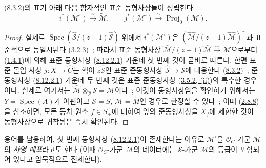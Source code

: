 \begin{proposition}[8.12.2]
\label{II.8.12.2-ko}
(\hyperref[II.8.3.2-ko]{8.3.2})의 표기 아래 다음 함자적인 표준
동형사상들이 성립한다.
\begin{equation}
\label{II.8.12.2.1-ko}
  i^*(\mathcal{M}^{\square})\xrightarrow{\sim}\widetilde{\mathcal{M}},
  \qquad
  j^*(\mathcal{M}^{\square})\xrightarrow{\sim}
  \operatorname{Proj}_0(\mathcal{M}).
\tag{8.12.2.1}
\end{equation}
\end{proposition}

\begin{proof}
실제로 $\operatorname{Spec}(\widehat{\mathcal{S}}/(z-1)\widehat{\mathcal{S}})$
위에서 $i^*(\mathcal{M}^{\square})$은
$\left(\widehat{\mathcal{M}}/(z-1)\widehat{\mathcal{M}}\right)^{\sim}$과
표준적으로 동일시된다
(\hyperref[II.3.2.3-ko]{3.2.3})~; 따라서 표준 동형사상
$\widehat{\mathcal{M}}/(z-1)\widehat{\mathcal{M}}
\xrightarrow{\sim}\mathcal{M}$으로부터
(\hyperref[II.1.4.1-ko]{1.4.1})에 의해 표준 동형사상
(\hyperref[II.8.12.2.1-ko]{8.12.2.1}) 가운데 첫 번째 것이 곧바로
따른다. 한편 표준 몰입 사상 $j:X\to\widehat{C}$는 핵이
$z\widehat{\mathcal{S}}$인 표준 준동형사상
$\widehat{\mathcal{S}}\to\mathcal{S}$에 대응한다
(\hyperref[II.8.3.2-ko]{8.3.2})~; 준동형사상
(\hyperref[II.8.12.2.1-ko]{8.12.2.1}) 가운데 두 번째 것은 표준
준동형사상 (\hyperref[II.3.5.2-ko]{3.5.2, (ii)})의 특수한 경우이다.
실제로 여기서는
$\widehat{\mathcal{M}}\otimes_{\widehat{\mathcal{S}}}\mathcal{S}
=\mathcal{M}$이다~; 이것이 동형사상임을 확인하기 위해서는
$Y=\operatorname{Spec}(A)$가 아핀이고
$\mathcal{S}=\widetilde{S}$, $\mathcal{M}=\widetilde{M}$인 경우로
한정할 수 있다~; 이때 (\hyperref[II.2.8.8-ko]{2.8.8})을 참조하면,
모든 동차 원소 $f\in S_+$에 대하여 앞의 준동형사상을 $X_f$에 제한한
것이 동형사상으로 귀착됨은 즉시 확인된다.
\end{proof}

용어를 남용하여, 첫 번째 동형사상
(\hyperref[II.8.12.2.1-ko]{8.12.2.1})이 존재한다는 이유로
$\mathcal{M}^{\square}$을 $\mathcal{O}_C$-가군
$\widetilde{\mathcal{M}}$의 \emph{사영 폐포}라고도 한다 (이때
$\mathcal{O}_C$-가군 $\widetilde{\mathcal{M}}$의 데이터에는
$\mathcal{S}$-가군 $\mathcal{M}$의 등급이 포함되어 있다고
암묵적으로 전제한다).

